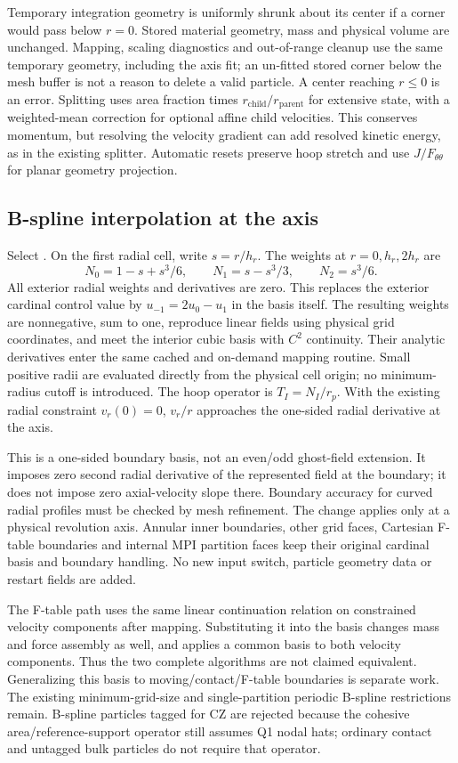 Temporary integration geometry is uniformly shrunk about its center if a
corner would pass below $r=0$. Stored material geometry, mass and physical
volume are unchanged. Mapping, scaling diagnostics and out-of-range cleanup
use the same temporary geometry, including the axis fit; an un-fitted
stored corner below the mesh buffer is not a reason to delete a valid particle.
A center reaching $r\leq0$ is an error. Splitting uses
area fraction times $r_{\mathrm{child}}/r_{\mathrm{parent}}$ for extensive
state, with a weighted-mean correction for optional affine child velocities.
This conserves momentum, but resolving the velocity gradient can add resolved
kinetic energy, as in the existing splitter. Automatic resets preserve hoop
stretch and use $J/F_{\theta\theta}$ for planar geometry projection.

\subsection{B-spline interpolation at the axis}
Select . On the first radial cell, write $s=r/h_r$.
The weights at $r=0,h_r,2h_r$ are
\[
 N_0=1-s+s^3/6,\qquad N_1=s-s^3/3,\qquad N_2=s^3/6.
\]
All exterior radial weights and derivatives are zero. This replaces the
exterior cardinal control value by $u_{-1}=2u_0-u_1$ in the basis itself.
The resulting weights are nonnegative, sum to one, reproduce linear fields
using physical grid coordinates, and meet the interior cubic basis with
$C^2$ continuity. Their analytic derivatives enter the same cached and
on-demand mapping routine. Small positive radii are evaluated directly from
the physical cell origin; no minimum-radius cutoff is introduced.
The hoop operator is $T_I=N_I/r_p$. With the existing radial constraint
$v_r(0)=0$, $v_r/r$ approaches the one-sided radial derivative at the axis.

This is a one-sided boundary basis, not an even/odd ghost-field extension.
It imposes zero second radial derivative of the represented field at the
boundary; it does not impose zero axial-velocity slope there. Boundary
accuracy for curved radial profiles must be checked by mesh refinement.
The change applies only at a physical revolution axis. Annular inner
boundaries, other grid faces, Cartesian F-table boundaries and internal MPI
partition faces keep their original cardinal basis and boundary handling.
No new input switch, particle geometry data or restart fields are added.

The F-table path uses the same linear continuation relation on constrained
velocity components after mapping. Substituting it into the basis changes
mass and force assembly as well, and applies a common basis to both velocity
components. Thus the two complete algorithms are not claimed equivalent.
Generalizing this basis to moving/contact/F-table boundaries is separate work.
The existing minimum-grid-size and single-partition periodic B-spline
restrictions remain. B-spline particles tagged for CZ are rejected because
the cohesive area/reference-support operator still assumes Q1 nodal hats;
ordinary contact and untagged bulk particles do not require that operator.

